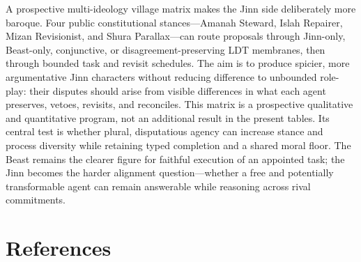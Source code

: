 \documentclass[
  11pt,
  letterpaper,
]{article}
\begin{document}
A prospective multi-ideology village matrix makes the Jinn side
deliberately more baroque. Four public constitutional stances---Amanah
Steward, Islah Repairer, Mizan Revisionist, and Shura Parallax---can
route proposals through Jinn-only, Beast-only, conjunctive, or
disagreement-preserving LDT membranes, then through bounded task and
revisit schedules. The aim is to produce spicier, more argumentative
Jinn characters without reducing difference to unbounded role-play:
their disputes should arise from visible differences in what each agent
preserves, vetoes, revisits, and reconciles. This matrix is a
prospective qualitative and quantitative program, not an additional
result in the present tables. Its central test is whether plural,
disputatious agency can increase stance and process diversity while
retaining typed completion and a shared moral floor. The Beast remains
the clearer figure for faithful execution of an appointed task; the
Jinn becomes the harder alignment question---whether a free and
potentially transformable agent can remain answerable while reasoning
across rival commitments.

\section{References}\label{references}
\end{document}

